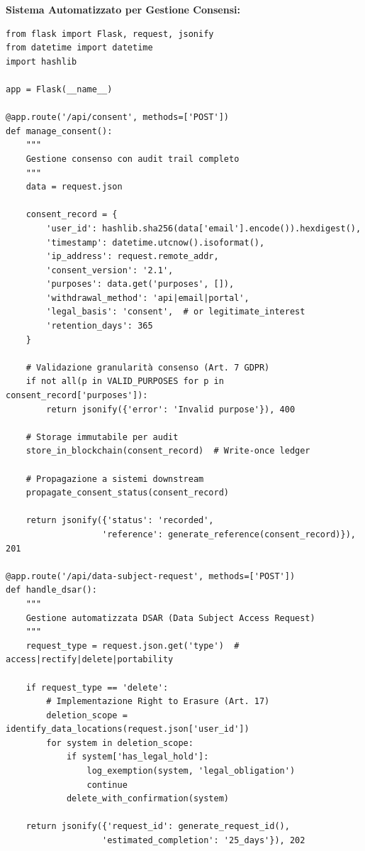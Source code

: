 \textbf{Sistema Automatizzato per Gestione Consensi:}
\begin{lstlisting}[caption={API REST per Gestione Consensi \gls{gdpr}},label={lst:gdpr_consent}]
from flask import Flask, request, jsonify
from datetime import datetime
import hashlib

app = Flask(__name__)

@app.route('/api/consent', methods=['POST'])
def manage_consent():
    """
    Gestione consenso con audit trail completo
    """
    data = request.json
    
    consent_record = {
        'user_id': hashlib.sha256(data['email'].encode()).hexdigest(),
        'timestamp': datetime.utcnow().isoformat(),
        'ip_address': request.remote_addr,
        'consent_version': '2.1',
        'purposes': data.get('purposes', []),
        'withdrawal_method': 'api|email|portal',
        'legal_basis': 'consent',  # or legitimate_interest
        'retention_days': 365
    }
    
    # Validazione granularità consenso (Art. 7 GDPR)
    if not all(p in VALID_PURPOSES for p in consent_record['purposes']):
        return jsonify({'error': 'Invalid purpose'}), 400
    
    # Storage immutabile per audit
    store_in_blockchain(consent_record)  # Write-once ledger
    
    # Propagazione a sistemi downstream
    propagate_consent_status(consent_record)
    
    return jsonify({'status': 'recorded', 
                   'reference': generate_reference(consent_record)}), 201

@app.route('/api/data-subject-request', methods=['POST'])
def handle_dsar():
    """
    Gestione automatizzata DSAR (Data Subject Access Request)
    """
    request_type = request.json.get('type')  # access|rectify|delete|portability
    
    if request_type == 'delete':
        # Implementazione Right to Erasure (Art. 17)
        deletion_scope = identify_data_locations(request.json['user_id'])
        for system in deletion_scope:
            if system['has_legal_hold']:
                log_exemption(system, 'legal_obligation')
                continue
            delete_with_confirmation(system)
    
    return jsonify({'request_id': generate_request_id(),
                   'estimated_completion': '25_days'}), 202
\end{lstlisting}

